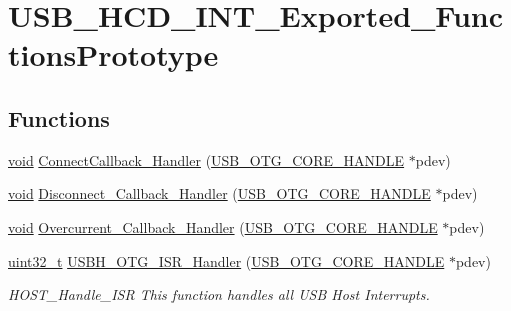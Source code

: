\hypertarget{group___u_s_b___h_c_d___i_n_t___exported___functions_prototype}{\section{U\-S\-B\-\_\-\-H\-C\-D\-\_\-\-I\-N\-T\-\_\-\-Exported\-\_\-\-Functions\-Prototype}
\label{group___u_s_b___h_c_d___i_n_t___exported___functions_prototype}
}
\subsection*{Functions}
\begin{DoxyCompactItemize}
\item 
\hyperlink{group___n_a_m_e_ga18028b8badbf1ea7e704ccac3c488e82}{void} \hyperlink{group___u_s_b___h_c_d___i_n_t___exported___functions_prototype_gacf4f4f3c5e895028be83d53d9763b940}{Connect\-Callback\-\_\-\-Handler} (\hyperlink{group___u_s_b___c_o_r_e___exported___types_gaf76054c11eb8a3367907aad7ae700e80}{U\-S\-B\-\_\-\-O\-T\-G\-\_\-\-C\-O\-R\-E\-\_\-\-H\-A\-N\-D\-L\-E} $\ast$pdev)
\item 
\hyperlink{group___n_a_m_e_ga18028b8badbf1ea7e704ccac3c488e82}{void} \hyperlink{group___u_s_b___h_c_d___i_n_t___exported___functions_prototype_gac54bb9ac0c143da70372b1b2c53d34de}{Disconnect\-\_\-\-Callback\-\_\-\-Handler} (\hyperlink{group___u_s_b___c_o_r_e___exported___types_gaf76054c11eb8a3367907aad7ae700e80}{U\-S\-B\-\_\-\-O\-T\-G\-\_\-\-C\-O\-R\-E\-\_\-\-H\-A\-N\-D\-L\-E} $\ast$pdev)
\item 
\hyperlink{group___n_a_m_e_ga18028b8badbf1ea7e704ccac3c488e82}{void} \hyperlink{group___u_s_b___h_c_d___i_n_t___exported___functions_prototype_ga65b8429b9521cc66062f111e9a663778}{Overcurrent\-\_\-\-Callback\-\_\-\-Handler} (\hyperlink{group___u_s_b___c_o_r_e___exported___types_gaf76054c11eb8a3367907aad7ae700e80}{U\-S\-B\-\_\-\-O\-T\-G\-\_\-\-C\-O\-R\-E\-\_\-\-H\-A\-N\-D\-L\-E} $\ast$pdev)
\item 
\hyperlink{stdint_8h_a435d1572bf3f880d55459d9805097f62}{uint32\-\_\-t} \hyperlink{group___u_s_b___h_c_d___i_n_t___exported___functions_prototype_ga0d058eb3d6ea01a9e47e6447690aa8c1}{U\-S\-B\-H\-\_\-\-O\-T\-G\-\_\-\-I\-S\-R\-\_\-\-Handler} (\hyperlink{group___u_s_b___c_o_r_e___exported___types_gaf76054c11eb8a3367907aad7ae700e80}{U\-S\-B\-\_\-\-O\-T\-G\-\_\-\-C\-O\-R\-E\-\_\-\-H\-A\-N\-D\-L\-E} $\ast$pdev)
\begin{DoxyCompactList}\small\item\em H\-O\-S\-T\-\_\-\-Handle\-\_\-\-I\-S\-R This function handles all U\-S\-B Host Interrupts. \end{DoxyCompactList}\end{DoxyCompactItemize}


